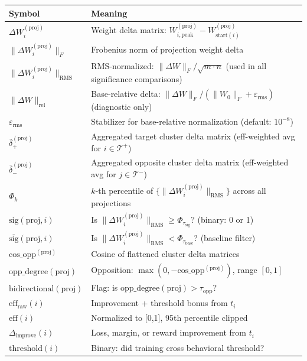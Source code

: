 \documentclass[11pt]{article}
\begin{document}
\begin{center}
\begin{tabular}{lp{}}
\toprule
\textbf{Symbol} & \textbf{Meaning} \\
\midrule
$\Delta W_i^{(\text{proj})}$ & Weight delta matrix: $W_{i,\text{peak}}^{(\text{proj})} - W_{\text{start}(i)}^{(\text{proj})}$ \\
$\|\Delta W_i^{(\text{proj})}\|_F$ & Frobenius norm of projection weight delta \\
$\|\Delta W_i^{(\text{proj})}\|_{\text{RMS}}$ & RMS-normalized: $\|\Delta W\|_F / \sqrt{m \cdot n}$ (used in all significance comparisons) \\
$\|\Delta W\|_{\text{rel}}$ & Base-relative delta: $\|\Delta W\|_F / (\|W_0\|_F + \varepsilon_{\text{rms}})$ (diagnostic only) \\
$\varepsilon_{\text{rms}}$ & Stabilizer for base-relative normalization (default: $10^{-8}$) \\
$\bar{\delta}^{(\text{proj})}_+$ & Aggregated target cluster delta matrix (eff-weighted avg for $i \in \mathcal{T}^+$) \\
$\bar{\delta}^{(\text{proj})}_-$ & Aggregated opposite cluster delta matrix (eff-weighted avg for $j \in \mathcal{T}^-$) \\
$\Phi_k$ & $k$-th percentile of $\{\|\Delta W^{(\text{proj})}_i\|_{\text{RMS}}\}$ across all projections \\
$\text{sig}(\text{proj},i)$ & Is $\|\Delta W^{(\text{proj})}_i\|_{\text{RMS}} \geq \Phi_{\tau_{\text{sig}}}$? (binary: 0 or 1) \\
$\overline{\text{sig}}(\text{proj},i)$ & Is $\|\Delta W^{(\text{proj})}_i\|_{\text{RMS}} < \Phi_{\tau_{\text{base}}}$? (baseline filter) \\
$\text{cos\_opp}^{(\text{proj})}$ & Cosine of flattened cluster delta matrices \\
$\text{opp\_degree}(\text{proj})$ & Opposition: $\max(0, -\text{cos\_opp}^{(\text{proj})})$, range $[0,1]$ \\
$\text{bidirectional}(\text{proj})$ & Flag: is $\text{opp\_degree}(\text{proj}) > \tau_{\text{opp}}$? \\
$\text{eff}_{\text{raw}}(i)$ & Improvement + threshold bonus from $t_i$ \\
$\text{eff}(i)$ & Normalized to [0,1], 95th percentile clipped \\
$\Delta_{\text{improve}}(i)$ & Loss, margin, or reward improvement from $t_i$ \\
$\text{threshold}(i)$ & Binary: did training cross behavioral threshold? \\

\end{tabular}
\end{center}
\end{document}
